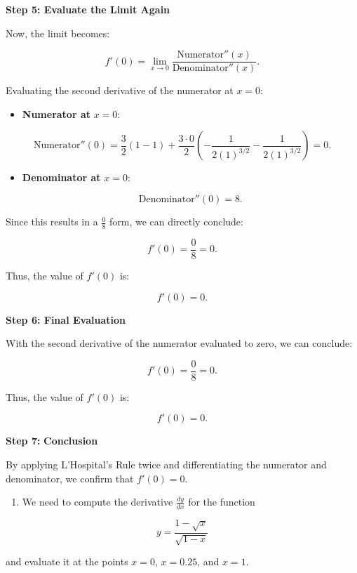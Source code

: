 \documentclass[
]{book}
\providecommand{\tightlist}{%
  \setlength{\itemsep}{0pt}\setlength{\parskip}{0pt}}
\theoremstyle{definition}
\theoremstyle{definition}
\theoremstyle{definition}
\theoremstyle{definition}
\theoremstyle{remark}
\begin{document}
\textbf{Step 5: Evaluate the Limit Again}

Now, the limit becomes:

\[
f'(0) = \lim_{x \to 0} \frac{\text{Numerator}''(x)}{\text{Denominator}''(x)}.
\]

Evaluating the second derivative of the numerator at \(x = 0\):

\begin{itemize}
\tightlist
\item
  \textbf{Numerator at} \(x = 0\):
\end{itemize}

\[
      \text{Numerator}''(0) = \frac{3}{2} \left( 1 - 1 \right) + \frac{3 \cdot 0}{2} \left( -\frac{1}{2(1)^{3/2}} - \frac{1}{2(1)^{3/2}} \right) = 0.
  \]

\begin{itemize}
\item
  \textbf{Denominator at} \(x = 0\):

  \[
   \text{Denominator}''(0) = 8.
   \]
\end{itemize}

Since this results in a \(\frac{0}{8}\) form, we can directly conclude:

\[
f'(0) = \frac{0}{8} = 0.
\]

Thus, the value of \(f'(0)\) is:

\[
f'(0) = 0.
\]

\textbf{Step 6: Final Evaluation}

With the second derivative of the numerator evaluated to zero, we can conclude:

\[
f'(0) = \frac{0}{8} = 0.
\]

Thus, the value of \(f'(0)\) is:

\[
f'(0) = 0.
\]

\textbf{Step 7:} \textbf{Conclusion}

By applying L'Hospital's Rule twice and differentiating the numerator and denominator, we confirm that \(f'(0) = 0\).

\begin{enumerate}
\def\labelenumi{\arabic{enumi}.}
\setcounter{enumi}{6}
\tightlist
\item
  We need to compute the derivative \(\frac{dy}{dx}\) for the function
\end{enumerate}

\[
y = \frac{1 - \sqrt{x}}{\sqrt{1 - x}}
\]

and evaluate it at the points \(x = 0\), \(x = 0.25\), and \(x = 1\).
\end{document}
